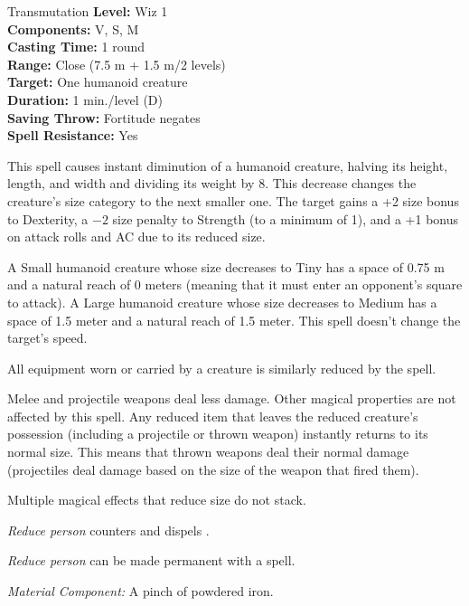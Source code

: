 {Transmutation}
{
	\textbf{Level:}
	Wiz 1\\
	\textbf{Components:}
	V, S, M\\
	\textbf{Casting Time:}
	1 round\\
	\textbf{Range:}
	Close (7.5 m + 1.5 m/2 levels)\\
	\textbf{Target:}
	One humanoid creature\\
	\textbf{Duration:}
	1 min./level (D)\\
	\textbf{Saving Throw:}
	Fortitude negates\\
	\textbf{Spell Resistance:}
	Yes\\
}
{
	This spell causes instant diminution of a humanoid creature, halving its height, length, and width and dividing its weight by 8. This decrease changes the creature's size category to the next smaller one. The target gains a +2 size bonus to Dexterity, a $-2$ size penalty to Strength (to a minimum of 1), and a +1 bonus on attack rolls and AC due to its reduced size.

	A Small humanoid creature whose size decreases to Tiny has a space of 0.75 m and a natural reach of 0 meters (meaning that it must enter an opponent's square to attack). A Large humanoid creature whose size decreases to Medium has a space of 1.5 meter and a natural reach of 1.5 meter. This spell doesn't change the target's speed.

	All equipment worn or carried by a creature is similarly reduced by the spell.

	Melee and projectile weapons deal less damage. Other magical properties are not affected by this spell. Any reduced item that leaves the reduced creature's possession (including a projectile or thrown weapon) instantly returns to its normal size. This means that thrown weapons deal their normal damage (projectiles deal damage based on the size of the weapon that fired them).

	Multiple magical effects that reduce size do not stack.

	\emph{Reduce person} counters and dispels .

	\emph{Reduce person} can be made permanent with a  spell.

	\textit{Material Component:}
	A pinch of powdered iron.

}
